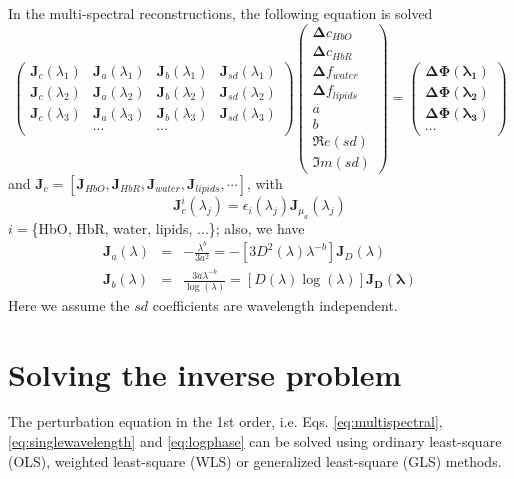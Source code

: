 \documentclass[12pt]{book}               %
\begin{document}
In the multi-spectral reconstructions, the following equation is solved
\begin{equation}\label{eq:multispectral}
\left(
\begin{array}{llll}
\mathbf{J}_{c}(\lambda_1) & \mathbf{J}_{a}(\lambda_1) & \mathbf{J}_b(\lambda_1) & \mathbf{J}_{sd}(\lambda_1)\\
\mathbf{J}_{c}(\lambda_2) & \mathbf{J}_{a}(\lambda_2) & \mathbf{J}_b(\lambda_2) & \mathbf{J}_{sd}(\lambda_2)\\
\mathbf{J}_{c}(\lambda_3) & \mathbf{J}_{a}(\lambda_3) & \mathbf{J}_b(\lambda_3) & \mathbf{J}_{sd}(\lambda_3)\\
 & \cdots & \cdots 
\end{array}\right)
\left(
\begin{array}{c}
\boldsymbol{\Delta}{c_{HbO}}\\
\boldsymbol{\Delta}{c_{HbR}}\\
\boldsymbol{\Delta}{f_{water}}\\
\boldsymbol{\Delta}{f_{lipids}}\\
a\\
b\\
\Re e({sd})\\
\Im m({sd})
\end{array}
\right)=\left(
\begin{array}{c}
\boldsymbol{\Delta\Phi(\lambda_1)}\\
\boldsymbol{\Delta\Phi(\lambda_2)}\\
\boldsymbol{\Delta\Phi(\lambda_3)}\\
\cdots
\end{array}\right)
\end{equation}
and $\mathbf{J}_{c}=\left[\mathbf{J}_{HbO}, \mathbf{J}_{HbR}, \mathbf{J}_{water}, \mathbf{J}_{lipids}, \cdots\right]$, with
\begin{equation}
\mathbf{J}_{c}^i(\lambda_j)=\epsilon_i(\lambda_j)\mathbf{J}_{\mu_a}(\lambda_j)
\end{equation}
$i=$\{HbO, HbR, water, lipids, ...\}; also, we have
\begin{eqnarray}
\mathbf{J}_a(\lambda)&=&-\frac{\lambda^{b}}{3a^2} = -\left[3D^2(\lambda)\lambda^{-b}\right]\mathbf{J}_D(\lambda)\\
\mathbf{J}_b(\lambda)&=& \frac{3a\lambda^{-b}}{\log(\lambda)} =\left[D(\lambda)\log(\lambda)\right]\mathbf{J_D(\lambda)}
\end{eqnarray}
Here we assume the $sd$ coefficients are wavelength independent.

\section{Solving the inverse problem}
The perturbation equation in the 1st order, i.e. Eqs. \ref{eq:multispectral}, \ref{eq:singlewavelength} and \ref{eq:logphase} can be solved using ordinary least-square (OLS), weighted least-square (WLS) or generalized least-square (GLS) methods.
\end{document}
